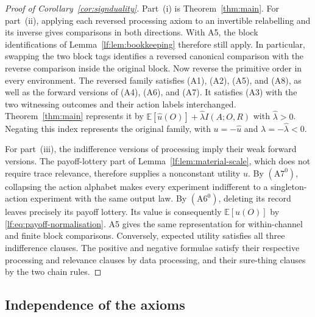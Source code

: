 \documentclass[11pt,a4paper]{article}
\theoremstyle{definition}
\newcommand{\E}{\mathbb E}
\newcommand{\I}{I}
\newcommand{\1}{\mathbf 1}
\begin{document}
\begin{proof}[Proof of Corollary~\ref{cor:signduality}]
Part~\textup{(i)} is Theorem~\ref{thm:main}.
For part~\textup{(ii)}, applying each reversed processing axiom to an
invertible relabelling and its inverse gives comparisons in both directions.
With A5, the block identifications of Lemma~\ref{lf:lem:bookkeeping}
therefore still apply.  In particular, swapping the two block tags identifies
a reversed canonical comparison with the reverse comparison inside the
original block.  Now reverse the primitive order in every environment.
The reversed family
satisfies \textup{(A1)}, \textup{(A2)}, \textup{(A5)}, and \textup{(A8)},
as well as the forward versions of \textup{(A4)}, \textup{(A6)}, and
\textup{(A7)}.  It satisfies \textup{(A3)} with the two witnessing outcomes
and their action labels interchanged.  Theorem~\ref{thm:main} represents it by
$\E[\widehat u(O)]+\widehat\lambda\I(A;O,R)$ with
$\widehat\lambda>0$.  Negating this index represents the original family,
with $u=-\widehat u$ and $\lambda=-\widehat\lambda<0$.

For part~\textup{(iii)}, the indifference versions of processing imply
their weak forward versions.  The payoff-lottery part of
Lemma~\ref{lf:lem:material-scale}, which does not require trace relevance,
therefore supplies a nonconstant utility $u$.  By $(\mathrm{A}7^0)$, collapsing
the action alphabet makes every experiment indifferent to a singleton-action
experiment with the same output law.  By $(\mathrm{A}6^0)$, deleting its
record leaves precisely its payoff lottery.  Its value is consequently
$\E[u(O)]$ by \eqref{lf:eq:payoff-normalisation}.  A5 gives the same
representation for within-channel and finite block comparisons.
Conversely, expected utility satisfies all three indifference clauses.
The positive and negative formulae satisfy their respective processing and
relevance clauses by data processing, and their sure-thing clauses by the
two chain rules.
\end{proof}

\subsection{Independence of the axioms}\label{app:axiom-independence}
\end{document}
